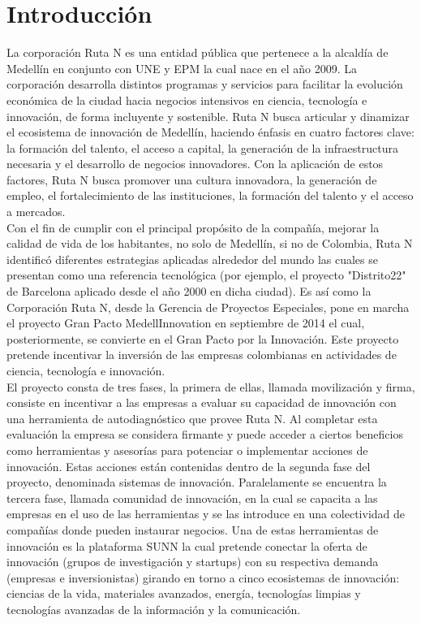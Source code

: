 \chapter*{Introducción}
La  corporación   Ruta  N  es  una   entidad  pública  que pertenece  a  la  alcaldía  de  Medellín  en  conjunto  con  UNE y  EPM  la  cual  nace  en  el  año  2009. La  corporación desarrolla  distintos  programas  y  servicios  para  facilitar  la evolución económica de la ciudad hacia negocios intensivos en ciencia,  tecnología e innovación,  de forma incluyente y sostenible. Ruta N busca articular y dinamizar el ecosistema de  innovación  de  Medellín,   haciendo  énfasis  en  cuatro factores clave:  la formación del talento, el acceso a capital, la generación de la infraestructura necesaria y el desarrollo de  negocios  innovadores. Con  la  aplicación  de  estos
factores, Ruta N busca promover una cultura innovadora, la generación de empleo, el fortalecimiento de las instituciones, la formación del talento y el acceso a mercados.\\

Con  el  fin  de  cumplir  con  el  principal  propósito  de  la compañía,  mejorar la calidad de vida de los habitantes,  no solo de Medellín, si no de Colombia, Ruta N identificó diferentes  estrategias  aplicadas  alrededor  del  mundo  las  cuales se presentan como una referencia tecnológica (por ejemplo, el proyecto "Distrito22" de Barcelona aplicado desde el año 2000 en dicha ciudad).  Es así como la Corporación Ruta N, desde la Gerencia de Proyectos Especiales, pone en marcha el  proyecto  Gran  Pacto  MedellInnovation  en  septiembre
de  2014  el  cual,  posteriormente,  se  convierte  en  el  Gran Pacto por la Innovación.  Este proyecto pretende incentivar la inversión de las empresas colombianas en actividades de ciencia, tecnología e innovación.\\

El  proyecto  consta  de  tres  fases,  la  primera  de  ellas, llamada  movilización  y  firma,  consiste  en  incentivar  a  las empresas  a  evaluar  su  capacidad  de  innovación  con  una
herramienta  de  autodiagnóstico  que  provee  Ruta  N.  Al completar esta evaluación la empresa se considera firmante y  puede  acceder  a  ciertos  beneficios  como  herramientas y   asesorías   para   potenciar   o   implementar   acciones   de
innovación. Estas  acciones  están  contenidas  dentro  de la  segunda  fase  del  proyecto,   denominada  sistemas  de innovación.
Paralelamente  se  encuentra  la  tercera  fase,
llamada comunidad de innovación, en la cual se capacita a las empresas en el uso de las herramientas y se las introduce en  una  colectividad  de  compañías  donde  pueden  instaurar negocios.   Una  de  estas  herramientas  de  innovación  es  la
plataforma  SUNN  la  cual  pretende  conectar  la  oferta  de innovación  (grupos  de  investigación  y  startups)  con  su respectiva  demanda  (empresas  e  inversionistas)  girando  en torno  a  cinco  ecosistemas  de  innovación:   ciencias  de  la
vida,  materiales  avanzados,  energía,  tecnologías  limpias  y tecnologías avanzadas de la información y la comunicación.\\

